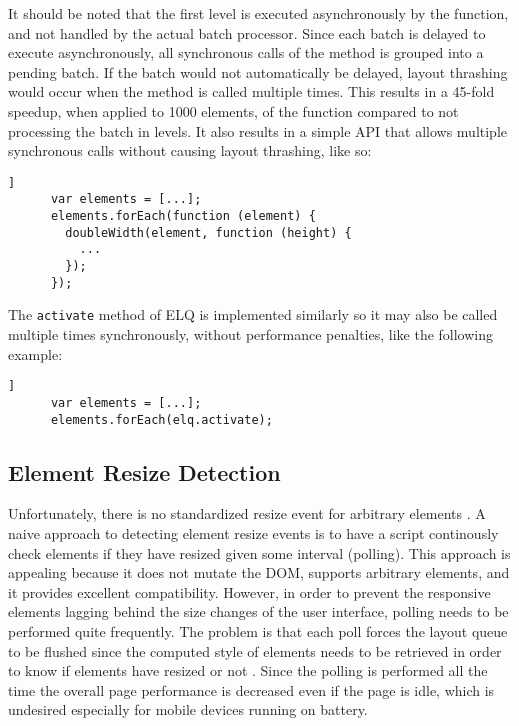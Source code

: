 \documentclass{acm_proc_article-sp}
\newcommand{\code}[1]{\texttt{#1}}
\newcommand{\elq}{ELQ}
\newcommand{\gls}[1]{#1}
\begin{document}
    It should be noted that the first level is executed asynchronously by the function, and not handled by the actual batch processor.
    Since each batch is delayed to execute asynchronously, all synchronous calls of the method is grouped into a pending batch.
    If the batch would not automatically be delayed, layout thrashing would occur when the method is called multiple times.
    This results in a 45-fold speedup, when applied to 1000 elements, of the function compared to not processing the batch in levels.
    It also results in a simple API that allows multiple synchronous calls without causing layout thrashing, like so:

    \begin{lstlisting}[gobble=6,label={},caption={},captionpos=b]]
      var elements = [...];
      elements.forEach(function (element) {
        doubleWidth(element, function (height) {
          ...
        });
      });
    \end{lstlisting}

    The \code{activate} method of \elq{} is implemented similarly so it may also be called multiple times synchronously, without performance penalties, like the following example:

    \begin{lstlisting}[gobble=6,label={},caption={},captionpos=b]]
      var elements = [...];
      elements.forEach(elq.activate);
    \end{lstlisting}
  
  \subsection{Element Resize Detection}\label{sec:imp_erd}
    Unfortunately, there is no standardized resize event for arbitrary elements \cite{w3c_dom2_events}.
    A naive approach to detecting element resize events is to have a script continously check elements if they have resized given some interval (polling).
    This approach is appealing because it does not mutate the \gls{DOM}, supports arbitrary elements, and it provides excellent compatibility.
    However, in order to prevent the \gls{responsive} elements lagging behind the size changes of the user interface, polling needs to be performed quite frequently.
    The problem is that each poll forces the layout queue to be flushed since the computed style of elements needs to be retrieved in order to know if elements have resized or not \cite{elq-thesis}.
    Since the polling is performed all the time the overall page performance is decreased even if the page is idle, which is undesired especially for mobile devices running on battery.
\end{document}

